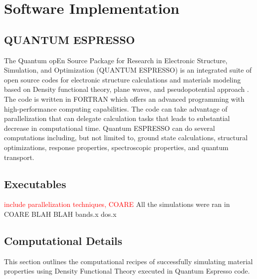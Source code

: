 \chapter{Software Implementation}
    \section{QUANTUM ESPRESSO}
    The Quantum opEn  Source  Package  for  Research  in  Electronic  Structure, Simulation, and Optimization (QUANTUM ESPRESSO) is an integrated suite of open source codes for electronic structure calculations and materials modeling based on Density functional theory, plane waves, and pseudopotential approach \citep{Giannozzi2009,Giannozzi2017}. The code is written in FORTRAN which offers an advanced programming with high-performance computing capabilities. The code can take advantage of parallelization that can delegate calculation tasks that leads to substantial decrease in computational time. Quantum ESPRESSO can do several computations including, but not limited to, ground state calculations, structural optimizations, response properties, spectroscopic properties, and quantum transport. 
    
    \section{Executables}
    \textcolor{red}{include parallelization techniques, COARE 
    }
    All the simulations were ran in COARE BLAH BLAH
    bands.x dos.x 
    \section{Computational Details}
    This section outlines the computational recipes of successfully simulating material properties using Density Functional Theory executed in  Quantum Espresso code. 


